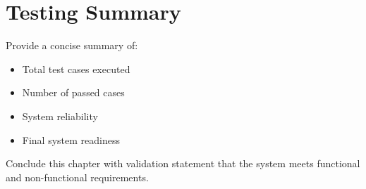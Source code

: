 
\section{Testing Summary}

Provide a concise summary of:

\begin{itemize}
    \item Total test cases executed
    \item Number of passed cases
    \item System reliability
    \item Final system readiness
\end{itemize}

Conclude this chapter with validation statement that the system
meets functional and non-functional requirements.
